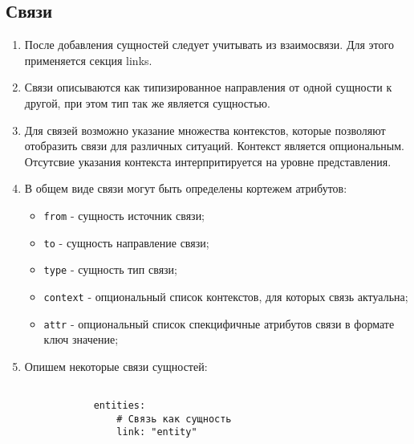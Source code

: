 \documentclass[final]{article}
\begin{document}
    \subsection{Связи}
        \begin{enumerate}

            \item После добавления сущностей следует учитывать из взаимосвязи. 
            Для этого применяется секция links.

            \item Связи описываются как типизированное направления от одной сущности 
            к другой, при этом тип так же является сущностью. 

            \item Для связей возможно указание множества контекстов, которые 
            позволяют отобразить связи для различных ситуаций. Контекст является 
            опциональным. Отсутсвие указания контекста интерпритируется на 
            уровне представления.

            \item В общем виде связи могут быть определены кортежем атрибутов:
            \begin{itemize}
                \item \texttt{from} - сущность источник связи;
                \item \texttt{to} - сущность направление связи;
                \item \texttt{type} - сущность тип связи;
                \item \texttt{context} - опциональный список контекстов, для которых связь актуальна;
                \item \texttt{attr} - опциональный список спекцифичные атрибутов 
                связи в формате ключ значение;
            \end{itemize}

            \item Опишем некоторые связи сущностей:

            \begin{verbatim}

            entities:
                # Связь как сущность
                link: "entity"


\end{verbatim}
\end{enumerate}
\end{document}
